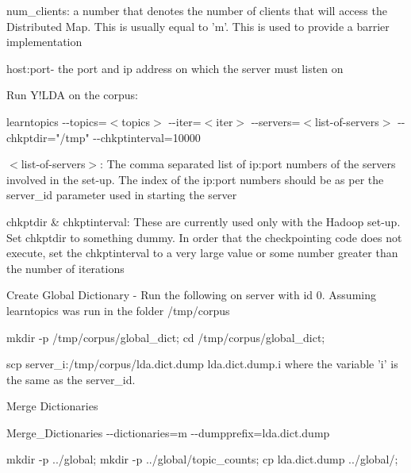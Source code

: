 \begin{DoxyEnumerate}
\begin{DoxyEnumerate}
\begin{DoxyEnumerate}
num\_\-clients: a number that denotes the number of clients that will access the Distributed Map. This is usually equal to 'm'. This is used to provide a barrier implementation 
\item 

host:port-\/ the port and ip address on which the server must listen on 
\end{DoxyEnumerate}
\item 

Run Y!LDA on the corpus: 
\begin{DoxyEnumerate}
\item 

{\ttfamily learntopics -\/-\/topics=$<$topics$>$ -\/-\/iter=$<$iter$>$ -\/-\/servers=$<$list-\/of-\/servers$>$ -\/-\/chkptdir="/tmp" -\/-\/chkptinterval=10000} 
\begin{DoxyEnumerate}
\item 

$<$list-\/of-\/servers$>$: The comma separated list of ip:port numbers of the servers involved in the set-\/up. The index of the ip:port numbers should be as per the server\_\-id parameter used in starting the server 
\item 

chkptdir \& chkptinterval: These are currently used only with the Hadoop set-\/up. Set chkptdir to something dummy. In order that the checkpointing code does not execute, set the chkptinterval to a very large value or some number greater than the number of iterations 
\end{DoxyEnumerate}
\item 

Create Global Dictionary -\/ Run the following on server with id 0. Assuming learntopics was run in the folder /tmp/corpus 
\begin{DoxyEnumerate}
\item 

{\ttfamily mkdir -\/p /tmp/corpus/global\_\-dict; cd /tmp/corpus/global\_\-dict;} 
\item 

{\ttfamily scp server\_\-i:/tmp/corpus/lda.dict.dump lda.dict.dump.i } where the variable 'i' is the same as the server\_\-id. 
\item 

Merge Dictionaries\par
 {\ttfamily Merge\_\-Dictionaries -\/-\/dictionaries=m -\/-\/dumpprefix=lda.dict.dump} 
\item 

{\ttfamily mkdir -\/p ../global; mkdir -\/p ../global/topic\_\-counts; cp lda.dict.dump ../global/;}  
\end{DoxyEnumerate}
\item 


\end{DoxyEnumerate}
\end{DoxyEnumerate}
\end{DoxyEnumerate}
